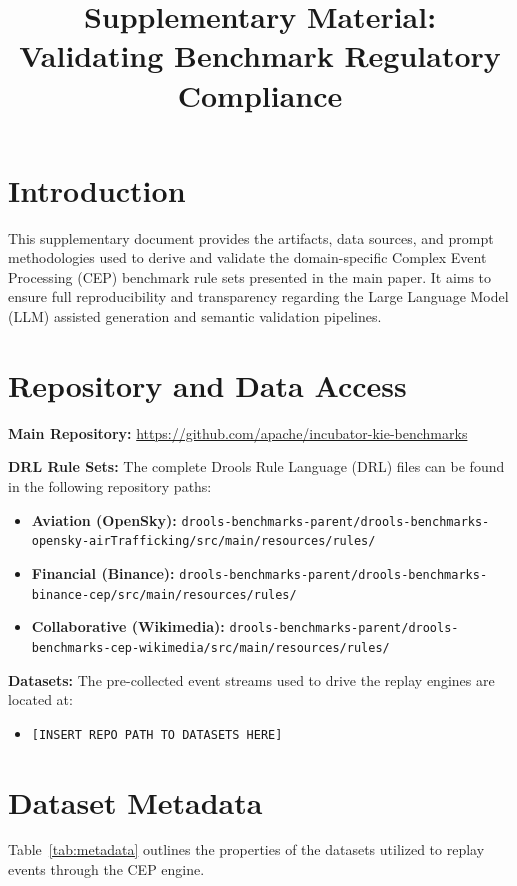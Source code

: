 \documentclass{article}
\title{Supplementary Material: Validating Benchmark Regulatory Compliance}
\date{}
\author{}
\begin{document}
\maketitle

\section{Introduction}
This supplementary document provides the artifacts, data sources, and prompt methodologies used to derive and validate the domain-specific Complex Event Processing (CEP) benchmark rule sets presented in the main paper. It aims to ensure full reproducibility and transparency regarding the Large Language Model (LLM) assisted generation and semantic validation pipelines.

\section{Repository and Data Access}
\textbf{Main Repository:} \url{https://github.com/apache/incubator-kie-benchmarks} %

\vspace{1em}
\noindent\textbf{DRL Rule Sets:}
The complete Drools Rule Language (DRL) files can be found in the following repository paths:
\begin{itemize}
    \item \textbf{Aviation (OpenSky):} \texttt{drools-benchmarks-parent/drools-benchmarks-opensky-airTrafficking/src/main/resources/rules/}
    \item \textbf{Financial (Binance):} \texttt{drools-benchmarks-parent/drools-benchmarks-binance-cep/src/main/resources/rules/}
    \item \textbf{Collaborative (Wikimedia):} \texttt{drools-benchmarks-parent/drools-benchmarks-cep-wikimedia/src/main/resources/rules/}
\end{itemize}

\vspace{1em}
\noindent\textbf{Datasets:}
The pre-collected event streams used to drive the replay engines are located at:
\begin{itemize}
    \item \texttt{[INSERT REPO PATH TO DATASETS HERE]}
\end{itemize}

\section{Dataset Metadata}
Table~\ref{tab:metadata} outlines the properties of the datasets utilized to replay events through the CEP engine.
\end{document}
